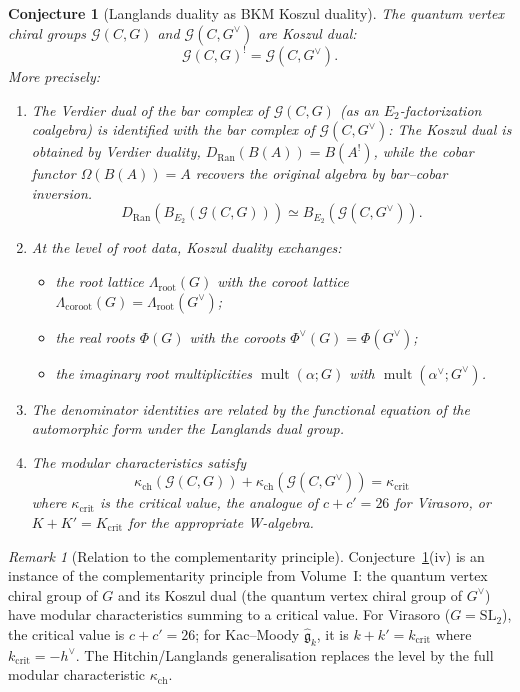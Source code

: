 \documentclass[11pt]{article}
\newtheorem{conjecture}[theorem]{Conjecture}
\theoremstyle{definition}
\theoremstyle{remark}
\newtheorem{remark}[theorem]{Remark}
\newcommand{\Ran}{\mathrm{Ran}}
\newcommand{\frakg}{\mathfrak{g}}
\DeclareMathOperator{\mult}{mult}
\begin{document}
\begin{conjecture}[Langlands duality as BKM Koszul duality]
\label{conj:langlands-koszul}
The quantum vertex chiral groups $\mathcal{G}(C, G)$ and $\mathcal{G}(C, G^\vee)$ are Koszul dual:
\[
 \boxed{\mathcal{G}(C, G)^! = \mathcal{G}(C, G^\vee).}
\]
More precisely:
\begin{enumerate}[label=(\roman*)]
 \item The Verdier dual of the bar complex of $\mathcal{G}(C, G)$ (as an $E_2$-factorization coalgebra) is identified with the bar complex of $\mathcal{G}(C, G^\vee)$:
 The Koszul dual is obtained by Verdier duality,
 $D_{\Ran}(B(A)) = B(A^!)$, while the cobar functor
 $\Omega(B(A)) = A$ recovers the original algebra by bar--cobar
 inversion.
 \[
 D_{\mathrm{Ran}}(B_{E_2}(\mathcal{G}(C, G))) \simeq B_{E_2}(\mathcal{G}(C, G^\vee)).
 \]
 \item At the level of root data, Koszul duality exchanges:
 \begin{itemize}
 \item the root lattice $\Lambda_{\mathrm{root}}(G)$ with the coroot lattice $\Lambda_{\mathrm{coroot}}(G) = \Lambda_{\mathrm{root}}(G^\vee)$;
 \item the real roots $\Phi(G)$ with the coroots $\Phi^\vee(G) = \Phi(G^\vee)$;
 \item the imaginary root multiplicities $\mult(\alpha; G)$ with $\mult(\alpha^\vee; G^\vee)$.
 \end{itemize}
 \item The denominator identities are related by the functional equation of the automorphic form under the Langlands dual group.
 \item The modular characteristics satisfy
 \[
 \kappa_{\mathrm{ch}}(\mathcal{G}(C, G)) + \kappa_{\mathrm{ch}}(\mathcal{G}(C, G^\vee)) = \kappa_{\mathrm{crit}}
 \]
 where $\kappa_{\mathrm{crit}}$ is the critical value, the analogue of $c + c' = 26$ for Virasoro, or $K + K' = K_{\mathrm{crit}}$ for the appropriate W-algebra.
\end{enumerate}
\end{conjecture}

\begin{remark}[Relation to the complementarity principle]
\label{rem:complementarity-langlands}
Conjecture~\ref{conj:langlands-koszul}(iv) is an instance of the complementarity principle from Volume~I: the quantum vertex chiral group of $G$ and its Koszul dual (the quantum vertex chiral group of $G^\vee$) have modular characteristics summing to a critical value. For Virasoro ($G = \mathrm{SL}_2$), the critical value is $c + c' = 26$; for Kac--Moody $\widehat{\frakg}_k$, it is $k + k' = k_{\mathrm{crit}}$ where $k_{\mathrm{crit}} = -h^\vee$. The Hitchin/Langlands generalisation replaces the level by the full modular characteristic $\kappa_{\mathrm{ch}}$.
\end{remark}
\end{document}
